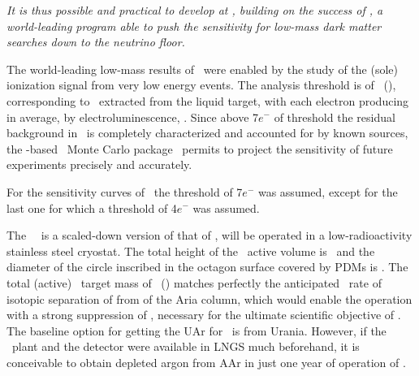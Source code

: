 {\it It is thus possible and practical to develop at \LNGS, building on the success of \DSf, a world-leading program able to push the sensitivity for low-mass dark matter searches down to the neutrino floor.}

The world-leading low-mass results of \DSfs\ were enabled by the study of the (sole) ionization signal from very low energy events.  The analysis threshold is of \DSfLowMassThresholdEe\ (\DSfLowMassThresholdNr), corresponding to \DSfLowMassThresholdE\ extracted from the liquid target, with each electron producing in average, by electroluminescence, \DSfLowMassThresholdPE.  Since above  7$e^-$  of threshold the residual background in \DSfs\ is completely characterized and accounted for by known sources, the \Geant-based \GFDS\ Monte Carlo package~\cite{Agnes:2017cz} permits to project the sensitivity of future experiments precisely and accurately.  

For the sensitivity curves of \DSls\ the  threshold of 7$e^-$ was assumed, except for the last one for which a threshold of 4$e^-$ was assumed.

The \DSps\ \TPC\ is a scaled-down version of that of \DSks, will be operated in a low-radioactivity stainless steel cryostat.  The total height of the \TPC\ active volume is \DSpTPCHeight\ and the diameter of the circle inscribed in the octagon surface covered by PDMs is \DSpTPCDiameter.  The total (active) \UAr\ target mass of \DSpTotalMass\ (\DSpActiveMass) matches perfectly the anticipated \AriaSeruciOneRate\ rate of isotopic separation of  from  of the Aria column, which would enable the operation with a strong suppression of , necessary for the ultimate scientific objective of \DSls.  The baseline option for getting the UAr for  \DSl\  is from Urania. However, if the \SeruciOne\ plant and the detector were available in LNGS much beforehand, it is conceivable to obtain depleted argon from AAr in just one year of operation of \SeruciOne.


